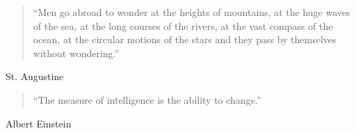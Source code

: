 \pagestyle{empty}
\vspace*{\fill}
\begin{quotation}
    \noindent ``Men go abroad to wonder at the heights of mountains, at the huge
    waves of the sea, at the long courses of the rivers, at the vast compass of
    the ocean, at the circular motions of the stars and they pass by themselves
    without wondering.''
\end{quotation}
\begin{flushright}
    St. Augustine
\end{flushright}
\vspace{1cm}

\begin{quotation}
\noindent
    ``The measure of intelligence is the ability to change.''
\end{quotation}
\begin{flushright}
    Albert Einstein
\end{flushright}
\vspace*{\fill}
\newpage
